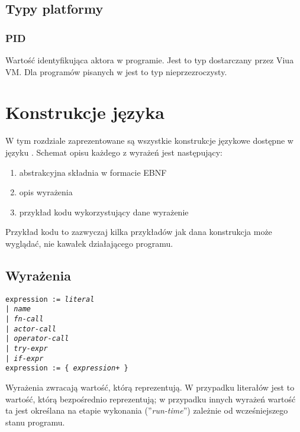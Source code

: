 \subsection{Typy platformy}

\subsubsection{PID}

Wartość identyfikująca aktora w programie.
Jest to typ dostarczany przez Viua VM. Dla programów pisanych w \ViuAct jest to
typ nieprzezroczysty.

\section{Konstrukcje języka}

W tym rozdziale zaprezentowane są wszystkie konstrukcje językowe dostępne w języku \ViuAct.
Schemat opisu każdego z wyrażeń jest następujący:

\begin{enumerate}
    \item abstrakcyjna składnia w formacie EBNF
    \item opis wyrażenia
    \item przykład kodu wykorzystujący dane wyrażenie
\end{enumerate}

Przykład kodu to zazwyczaj kilka przykładów jak dana konstrukcja może wyglądać, nie kawałek działającego
programu.

\subsection{Wyrażenia}
\label{language_expressions}

\texttt{expression := \emph{literal} \\
\phantom{expression :}| \emph{name} \\
\phantom{expression :}| \emph{fn-call} \\
\phantom{expression :}| \emph{actor-call} \\
\phantom{expression :}| \emph{operator-call} \\
\phantom{expression :}| \emph{try-expr} \\
\phantom{expression :}| \emph{if-expr}}
\\
\texttt{expression := \{ \emph{expression}+ \}}
\vspace{1em}

Wyrażenia zwracają wartość, którą reprezentują. W przypadku literałów jest to wartość, którą bezpośrednio
reprezentują; w przypadku innych wyrażeń wartość ta jest określana na etapie wykonania (''\emph{run-time}'')
zależnie od wcześniejszego stanu programu.

